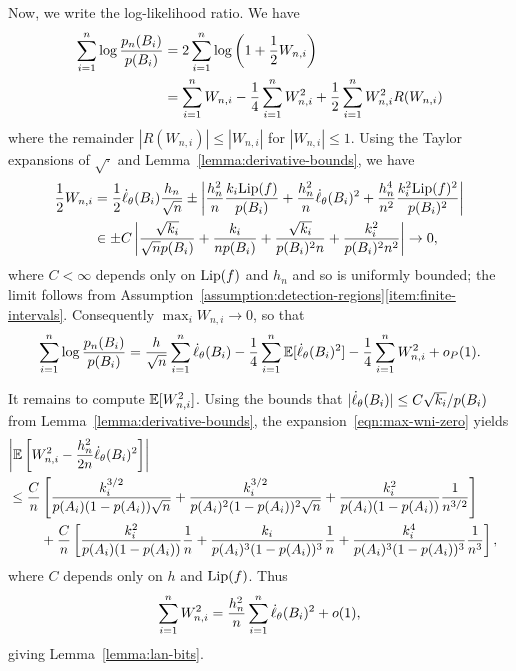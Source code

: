 Now, we write the log-likelihood ratio. We have
\begin{align*}
  \sum_{i = 1}^n \log \frac{p_n(B_i)}{p(B_i)}
  & = 2 \sum_{i = 1}^n \log\left(1 + \frac{1}{2} W_{n,i}\right) \\
  & = \sum_{i = 1}^n W_{n,i}
  - \frac{1}{4} \sum_{i = 1}^n W_{n,i}^2
  + \frac{1}{2} \sum_{i = 1}^n W_{n,i}^2 R(W_{n,i})
\end{align*}
where the remainder $|R(W_{n,i})| \le |W_{n,i}|$ for $|W_{n,i}| \le 1$.
Using the Taylor expansions of $\sqrt{\cdot}$ and
Lemma~\ref{lemma:derivative-bounds}, we have
\begin{align}
  \nonumber
  \frac{1}{2} W_{n,i}
  & = \frac{1}{2} \dot{\ell}_\theta(B_i)
  \frac{h_n}{\sqrt{n}}
  \pm \left|\frac{h_n^2}{n} \frac{k_i {\rm \textup{Lip}}(f)}{p(B_i)}
  + \frac{h_n^2}{n} \dot{\ell}_\theta(B_i)^2
  + \frac{ h_n^4}{n^2} \frac{k_i^2 {\rm \textup{Lip}}(f)^2}{p(B_i)^2}\right| \\
  & \in \pm
  C \left|\frac{\sqrt{k_i}}{\sqrt{n} p(B_i)}
  + \frac{k_i}{n p(B_i)}
  + \frac{\sqrt{k_i}}{p(B_i)^2 n}
  + \frac{k_i^2}{p(B_i)^2 n^2}
  \right| \to 0,
  \label{eqn:max-wni-zero}
\end{align}
where $C < \infty$ depends only on ${\rm \textup{Lip}}(f)$ and $h_n$ and so is
uniformly bounded;
the limit follows from Assumption~\ref{assumption:detection-regions}\eqref{item:finite-intervals}.
Consequently $\max_i W_{n,i} \to 0$, so that
\begin{equation}
  \label{eqn:almost-at-the-end}
  \sum_{i = 1}^n \log \frac{p_n(B_i)}{p(B_i)}
  = \frac{h}{\sqrt{n}} \sum_{i = 1}^n \dot{\ell}_\theta(B_i)
  - \frac{1}{4} \sum_{i = 1}^n \mathbb{E}[\dot{\ell}_\theta(B_i)^2]
  - \frac{1}{4} \sum_{i = 1}^n W_{n,i}^2 + o_P(1).
\end{equation}

It remains to compute $\mathbb{E}[W_{n,i}^2]$. Using the bounds
that $|\dot{\ell}_\theta(B_i)| \le C \sqrt{k_i} / p(B_i)$ from
Lemma~\ref{lemma:derivative-bounds},
the
expansion~\eqref{eqn:max-wni-zero}
yields
\begin{align*}
  \lefteqn{\left|\E\left[W_{n,i}^2 - \frac{h_n^2}{2n} \score_\theta(B_i)^2\right]
    \right|} \\
  &
  \le \frac{C}{n} \left[
    \frac{k_i^{3/2}}{p(A_i)(1 - p(A_i)) \sqrt{n}}
    + \frac{k_i^{3/2}}{p(A_i)^2 (1 - p(A_i))^2 \sqrt{n}}
    + \frac{k_i^2}{p(A_i)(1 - p(A_i))} \frac{1}{n^{3/2}}
    \right] \\
  & \qquad ~ +
  \frac{C}{n}
  \left[\frac{k_i^2}{p(A_i)(1 - p(A_i))} \frac{1}{n}
    + \frac{k_i}{p(A_i)^3(1 - p(A_i))^3} \frac{1}{n}
    + \frac{k_i^4}{p(A_i)^3 (1 - p(A_i))^3} \frac{1}{n^3} \right],
\end{align*}
where $C$ depends only on $h$ and ${\rm \textup{Lip}}(f)$.
Thus
\begin{equation*}
  \sum_{i = 1}^n W_{n,i}^2
  = \frac{h_n^2}{n} \sum_{i = 1}^n \dot{\ell}_\theta(B_i)^2
  + o(1),
\end{equation*}
giving Lemma~\ref{lemma:lan-bits}.

